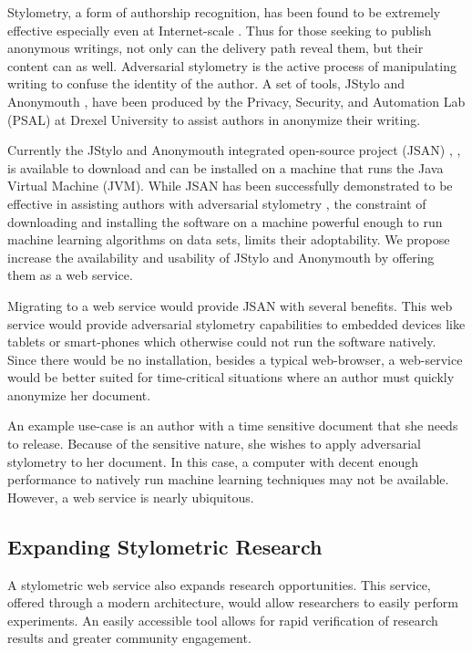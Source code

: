 \documentclass[letterpaper]{article}
\begin{document}
Stylometry, a form of authorship recognition, has been found to be
extremely effective especially even at
Internet-scale \cite{Narayanan:2012:FIA:2310656.2310687}.  Thus for
those seeking to publish anonymous writings, not only can the delivery
path reveal them, but their content can as well.  Adversarial
stylometry is the active process of manipulating writing to confuse
the identity of the author.  A set of tools, JStylo and
Anonymouth \cite{conf/pet/McDonaldACSG12}, have been produced by the
Privacy, Security, and Automation Lab (PSAL) at Drexel University to
assist authors in anonymize their writing.

Currently the JStylo and Anonymouth integrated open-source project
(JSAN) \cite{BrennanG09}, \cite{journals/tissec/BrennanAG12},
\cite{conf/pet/McDonaldACSG12} is available to download and can be
installed on a machine that runs the Java Virtual Machine (JVM).
While JSAN has been successfully demonstrated to be effective in
assisting authors with adversarial stylometry
\cite{journals/tissec/BrennanAG12}, the constraint of downloading and
installing the software on a machine powerful enough to run machine
learning algorithms on data sets, limits their adoptability.  We
propose increase the availability and usability of JStylo and
Anonymouth by offering them as a web service.

Migrating to a web service would provide JSAN with several benefits.
This web service would provide adversarial stylometry capabilities to
embedded devices like tablets or smart-phones which otherwise could
not run the software natively.  Since there would be no installation,
besides a typical web-browser, a web-service would be better suited
for time-critical situations where an author must quickly anonymize
her document.

An example use-case is an author with a time sensitive document that
she needs to release.  Because of the sensitive nature, she wishes to
apply adversarial stylometry to her document.  In this case, a
computer with decent enough performance to natively run machine
learning techniques may not be available.  However, a web service is
nearly ubiquitous.

\subsection{Expanding Stylometric Research}

A stylometric web service also expands research opportunities.  This
service, offered through a modern architecture, would allow
researchers to easily perform experiments.  An easily accessible tool
allows for rapid verification of research results and greater
community engagement.
\end{document}
